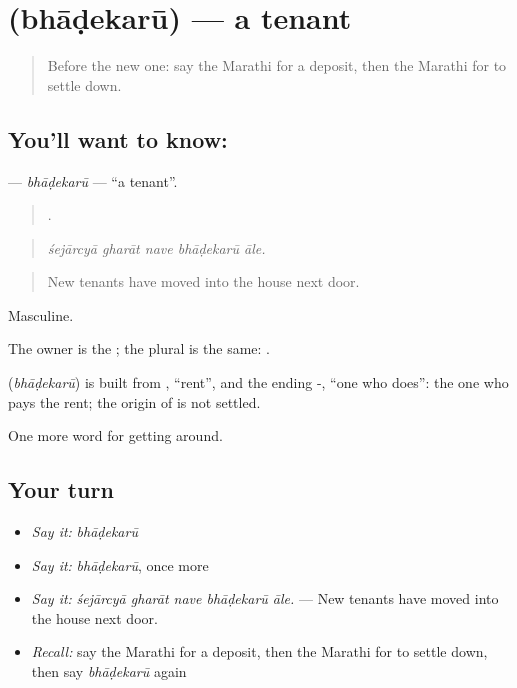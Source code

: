 \section[\texorpdfstring{\mr{भाडेकरू} (bhāḍekarū)}{भाडेकरू (bhāḍekarū)}]{ (bhāḍekarū) — a tenant}

\label{lesson:MR-C417-bhadekaru}



\begin{quote}
Before the new one: say the Marathi for a deposit, then the Marathi for to settle down.
\end{quote}

\subsection*{You'll want to know: }
\textbf{} — \emph{bhāḍekarū} — \textquotedblleft{}a tenant\textquotedblright{}.

\begin{quote}
    .
\end{quote}

\begin{quote}
\emph{śejārcyā gharāt nave bhāḍekarū āle.}
\end{quote}

\begin{quote}
New tenants have moved into the house next door.
\end{quote}

Masculine.

The owner is the ; the plural is the same:  .

\begin{cousinweb}
\textbf{} (\emph{bhāḍekarū}) is built from \textbf{}, \textquotedblleft{}rent\textquotedblright{}, and the ending -, \textquotedblleft{}one who does\textquotedblright{}: the one who pays the rent; the origin of  is not settled.
\end{cousinweb}

\begin{grammarlens}[title={What you've built}]
One more word for getting around.
\end{grammarlens}

\subsection*{Your turn}
\begin{itemize}
\raggedright
  \item \emph{Say it:} \emph{bhāḍekarū}
  \item \emph{Say it:} \emph{bhāḍekarū}, once more
  \item \emph{Say it:} \emph{śejārcyā gharāt nave bhāḍekarū āle.} — New tenants have moved into the house next door.
  \item \emph{Recall:} say the Marathi for a deposit, then the Marathi for to settle down, then say \emph{bhāḍekarū} again
\end{itemize}

